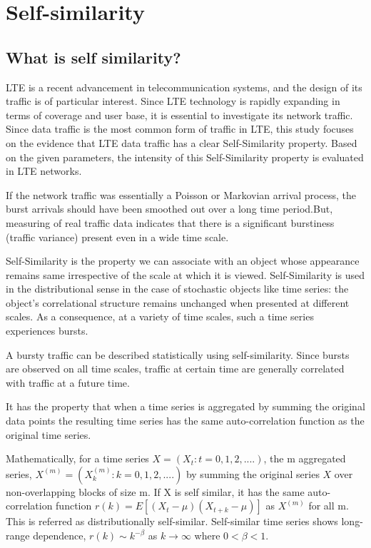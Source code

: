 \chapter{Self-similarity}

\section{What is self similarity?}

LTE is a recent advancement in telecommunication systems, and the design of its traffic is of particular interest. Since LTE technology is rapidly expanding in terms of coverage and user base, it is essential to investigate its network traffic. Since data traffic is the most common form of traffic in LTE, this study focuses on the evidence that LTE data traffic has a clear Self-Similarity property. Based on the given parameters, the intensity of this Self-Similarity property is evaluated in LTE networks.

 If the network traffic was essentially a Poisson or Markovian arrival process, the burst arrivals should have been smoothed out over a long time period.But, measuring of real traffic data indicates that there is a significant burstiness (traffic variance) present even in a wide time scale.
 
 Self-Similarity is the property we can associate with an object whose appearance remains same irrespective of the scale at which it is viewed. Self-Similarity is used in the distributional sense in the case of stochastic objects like time series: the object's correlational structure remains unchanged when presented at different scales. As a consequence, at a variety of time scales, such a time series experiences bursts.
 
A bursty traffic can be described statistically using self-similarity. Since bursts are observed on all time scales, traffic at certain time are generally correlated with traffic at a future time.



It has the property that when a time series is aggregated by summing the original data points the resulting time series has the same auto-correlation function as the original time series.

Mathematically, for a time series $X = (X_t : t=0,1,2,....)$, the m aggregated series, $X^{(m)}=(X_k^{(m)}:k=0,1,2,....)$ by summing the original series $X$ over non-overlapping blocks of size m. If X is self similar, it has the same auto-correlation function $r(k)=E[(X_t-\mu)(X_{t+k}-\mu)]$ as $X^{(m)}$ for all m. This is referred as distributionally self-similar. Self-similar time series shows long-range dependence, $r(k) \sim k^{-\beta}$ as $k\to\infty$ where $0<\beta<1 $.

